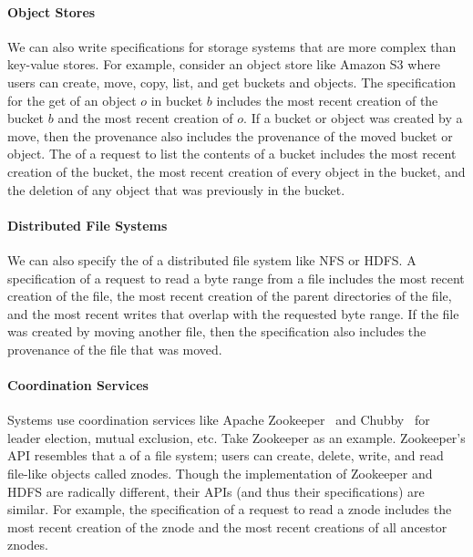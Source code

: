 \paragraph{Object Stores}
We can also write \watprovenance{} specifications for storage systems that are
more complex than key-value stores. For example, consider an object store like
Amazon S3 where users can create, move, copy, list, and get buckets and
objects. The \watprovenance{} specification for the get of an object $o$ in
bucket $b$ includes the most recent creation of the bucket $b$ and the most
recent creation of $o$. If a bucket or object was created by a move, then the
provenance also includes the provenance of the moved bucket or object. The
\watprovenance{} of a request to list the contents of a bucket includes the
most recent creation of the bucket, the most recent creation of every object in
the bucket, and the deletion of any object that was previously in the bucket.

\paragraph{Distributed File Systems}
We can also specify the \watprovenance{} of a distributed file system like NFS
or HDFS. A \watprovenance{} specification of a request to read a byte range
from a file includes the most recent creation of the file, the most recent
creation of the parent directories of the file, and the most recent writes that
overlap with the requested byte range. If the file was created by moving
another file, then the \watprovenance{} specification also includes the
provenance of the file that was moved.

\paragraph{Coordination Services}
Systems use coordination services like Apache
Zookeeper~\cite{hunt2010zookeeper} and Chubby~\cite{burrows2006chubby} for
leader election, mutual exclusion, etc. Take Zookeeper as an example.
Zookeeper's API resembles that a of a file system; users can create, delete,
write, and read file-like objects called znodes. Though the implementation of
Zookeeper and HDFS are radically different, their APIs (and thus their
\watprovenance{} specifications) are similar. For example, the \watprovenance{}
specification of a request to read a znode includes the most recent creation of
the znode and the most recent creations of all ancestor znodes.

